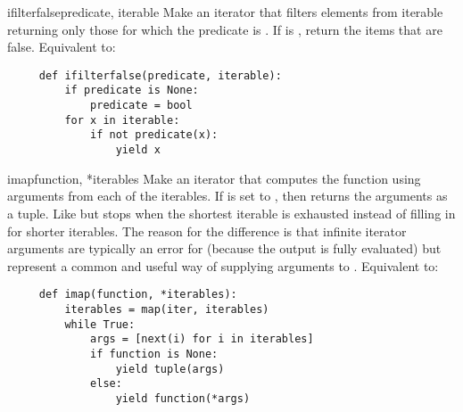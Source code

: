 \begin{funcdesc}{ifilterfalse}{predicate, iterable}
  Make an iterator that filters elements from iterable returning only
  those for which the predicate is .
  If  is , return the items that are false.
  Equivalent to:

  \begin{verbatim}
     def ifilterfalse(predicate, iterable):
         if predicate is None:
             predicate = bool
         for x in iterable:
             if not predicate(x):
                 yield x
  \end{verbatim}
\end{funcdesc}

\begin{funcdesc}{imap}{function, *iterables}
  Make an iterator that computes the function using arguments from
  each of the iterables.  If  is set to , then
   returns the arguments as a tuple.  Like
   but stops when the shortest iterable is exhausted
  instead of filling in  for shorter iterables.  The reason
  for the difference is that infinite iterator arguments are typically
  an error for  (because the output is fully evaluated)
  but represent a common and useful way of supplying arguments to
  .
  Equivalent to:

  \begin{verbatim}
     def imap(function, *iterables):
         iterables = map(iter, iterables)
         while True:
             args = [next(i) for i in iterables]
             if function is None:
                 yield tuple(args)
             else:
                 yield function(*args)
  \end{verbatim}
\end{funcdesc}

